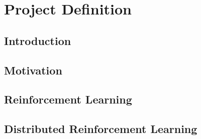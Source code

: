 \chapter{Project Definition}

\section{Introduction}

\cite{AlgorithmDistillation}

\section{Motivation}

\section{Reinforcement Learning}

\section{Distributed Reinforcement Learning}